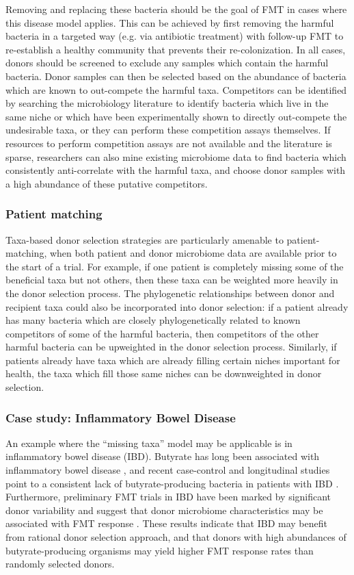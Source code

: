 Removing and replacing these bacteria should be the goal of FMT in cases where this disease model applies.
This can be achieved by first removing the harmful bacteria in a targeted way (e.g. via antibiotic treatment) with follow-up FMT to re-establish a healthy community that prevents their re-colonization.
In all cases, donors should be screened to exclude any samples which contain the harmful bacteria.
Donor samples can then be selected based on the abundance of bacteria which are known to out-compete the harmful taxa.
Competitors can be identified by searching the microbiology literature to identify bacteria which live in the same niche or which have been experimentally shown to directly out-compete the undesirable taxa, or they can perform these competition assays themselves.
If resources to perform competition assays are not available and the literature is sparse, researchers can also mine existing microbiome data to find bacteria which consistently anti-correlate with the harmful taxa, and choose donor samples with a high abundance of these putative competitors.

\subsubsection{Patient matching}

Taxa-based donor selection strategies are particularly amenable to patient-matching, when both patient and donor microbiome data are available prior to the start of a trial.
For example, if one patient is completely missing some of the beneficial taxa but not others, then these taxa can be weighted more heavily in the donor selection process.
The phylogenetic relationships between donor and recipient taxa could also be incorporated into donor selection: if a patient already has many bacteria which are closely phylogenetically related to known competitors of some of the harmful bacteria, then competitors of the other harmful bacteria can be upweighted in the donor selection process.
Similarly, if patients already have taxa which are already filling certain niches important for health, the taxa which fill those same niches can be downweighted in donor selection.

\subsubsection{Case study: Inflammatory Bowel Disease}

An example where the ``missing taxa'' model may be applicable is in inflammatory bowel disease (IBD).
Butyrate has long been associated with inflammatory bowel disease \cite{Scheppach1992}, and recent case-control and longitudinal studies point to a consistent lack of butyrate-producing bacteria in patients with IBD \cite{Duvallet2017,Schirmer2018}.
Furthermore, preliminary FMT trials in IBD have been marked by significant donor variability and suggest that donor microbiome characteristics may be associated with FMT response \cite{Moayyedi2015,Kump2018}.
These results indicate that IBD may benefit from rational donor selection approach, and that donors with high abundances of butyrate-producing organisms may yield higher FMT response rates than randomly selected donors.

